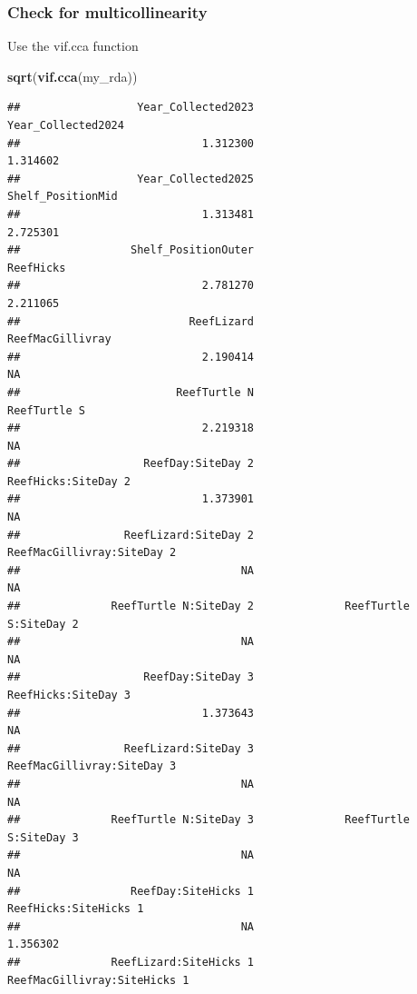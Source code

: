 \documentclass[
]{article}
\newenvironment{Shaded}{\begin{snugshade}}{\end{snugshade}}
\newcommand{\FunctionTok}[1]{\textcolor[rgb]{0.13,0.29,0.53}{\textbf{#1}}}
\newcommand{\NormalTok}[1]{#1}
\begin{document}
\subsubsection{Check for
multicollinearity}\label{check-for-multicollinearity}

Use the vif.cca function

\begin{Shaded}
\begin{Highlighting}[]
\FunctionTok{sqrt}\NormalTok{(}\FunctionTok{vif.cca}\NormalTok{(my\_rda))}
\end{Highlighting}
\end{Shaded}

\begin{verbatim}
##                  Year_Collected2023                  Year_Collected2024 
##                            1.312300                            1.314602 
##                  Year_Collected2025                   Shelf_PositionMid 
##                            1.313481                            2.725301 
##                 Shelf_PositionOuter                           ReefHicks 
##                            2.781270                            2.211065 
##                          ReefLizard                    ReefMacGillivray 
##                            2.190414                                  NA 
##                        ReefTurtle N                        ReefTurtle S 
##                            2.219318                                  NA 
##                   ReefDay:SiteDay 2                 ReefHicks:SiteDay 2 
##                            1.373901                                  NA 
##                ReefLizard:SiteDay 2          ReefMacGillivray:SiteDay 2 
##                                  NA                                  NA 
##              ReefTurtle N:SiteDay 2              ReefTurtle S:SiteDay 2 
##                                  NA                                  NA 
##                   ReefDay:SiteDay 3                 ReefHicks:SiteDay 3 
##                            1.373643                                  NA 
##                ReefLizard:SiteDay 3          ReefMacGillivray:SiteDay 3 
##                                  NA                                  NA 
##              ReefTurtle N:SiteDay 3              ReefTurtle S:SiteDay 3 
##                                  NA                                  NA 
##                 ReefDay:SiteHicks 1               ReefHicks:SiteHicks 1 
##                                  NA                            1.356302 
##              ReefLizard:SiteHicks 1        ReefMacGillivray:SiteHicks 1 

\end{verbatim}
\end{document}
